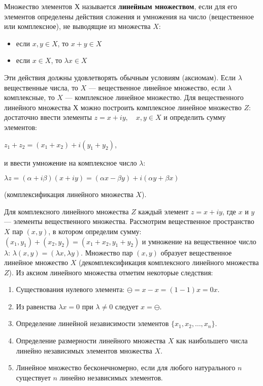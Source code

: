 \documentclass[12pt,a4paper,titlepage]{book}
\theoremstyle{definition}
\theoremstyle{plain}
\theoremstyle{remark}
\theoremstyle{plain}
\begin{document}
\par Множество элементов $Х$ называется \textbf{линейным множеством}, если для его элементов определены действия сложения и умножения на число (вещественное или комплексное), не выводящие из множества $X$:
\begin{itemize}
    \item если $x,y\in X$, то $x+y\in X$
    \item если $x\in X$, то $\lambda x\in X$
\end{itemize}
\par Эти действия должны удовлетворять обычным условиям (аксиомам). Если $\lambda$ вещественные числа, то $X$ --- вещественное линейное множество, если $\lambda$ комплексные, то $X$ --- комплексное линейное множество. Для вещественного линейного множества $Х$ можно построить комплексное линейное множество $Z$: достаточно ввести элементы $z=x+iy,\quad x,y \in X$ и определить сумму элементов:
\begin{center}
$z_1+z_2=(x_1+x_2)+i(y_1+y_2)$,
\end{center}
и ввести умножение на комплексное число $\lambda$:
\begin{center}
$\lambda z = (\alpha + i\beta)(x+iy) = (\alpha x - \beta y)+i(\alpha y + \beta x)$
\end{center}
(комплексификация линейного множества $X$).
\par Для комплексного линейного множества $Z$ каждый элемент $z=x+iy$, где $x$ и $y$ --- элементы вещественного множества. Рассмотрим вещественное пространство $X$ пар $(x,y)$, в котором определим сумму: $(x_1,y_1)+(x_2,y_2) = (x_1+x_2,y_1+y_2)$ и умножение на вещественное число $\lambda$: $\lambda(x,y) = (\lambda x, \lambda y)$. Множество пар $(x,y)$ образует вещественное линейное множество  $X$ (декомплексификация комплексного линейного множества $Z$).
Из аксиом линейного множества отметим некоторые следствия:
\begin{enumerate}
\item Существования нулевого элемента: $\ominus=x-x=(1-1)x=0x$.
\item Из равенства $\lambda x=0$ при $\lambda\ne0$ следует $x=\ominus$.
\item Определение линейной независимости элементов $\{x_1,x_2,\dotsc,x_n\}$.
\item Определение размерности линейного множества $X$ как наибольшего числа линейно независимых элементов множества $X$.
\item Линейное множество бесконечномерно, если для любого натурального $n$ существует $n$ линейно независимых элементов.
\end{enumerate}
\end{document}
